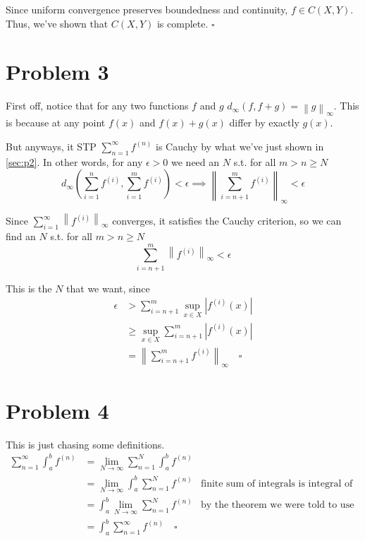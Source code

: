 \documentclass[12pt]{article}
\newcommand{\norm}[1]{\left\lVert#1\right\rVert}
\begin{document}
Since uniform convergence preserves boundedness and continuity, $f \in C(X, Y)$.
Thus, we've shown that $C(X, Y)$ is complete. $\square$

\pagebreak

\section{Problem 3}

First off, notice that for any two functions $f$ and $g$ $d_\infty(f, f+g) = \norm{g}_\infty$.
This is because at any point $f(x)$ and $f(x)+g(x)$ differ by exactly $g(x)$.

But anyways, it STP $\sum_{n=1}^\infty f^{(n)}$ is Cauchy by what we've just shown in \ref{sec:p2}.
In other words, for any $\epsilon > 0$ we need an $N$ s.t. for all $m > n \ge N$
\[d_\infty\left(\sum_{i=1}^n f^{(i)}, \sum_{i=1}^m f^{(i)}\right) < \epsilon
\implies \norm{\sum_{i=n+1}^m f^{(i)}}_\infty < \epsilon\]

Since $\sum_{i=1}^\infty \norm{f^{(i)}}_\infty$ converges,
it satisfies the Cauchy criterion, so we can find an $N$ s.t. for all $m > n \ge N$
\[\sum_{i=n+1}^m \norm{f^{(i)}}_\infty < \epsilon\]

This is the $N$ that we want, since
\begin{align*}
    \epsilon 
    &> \sum_{i=n+1}^m \sup_{x \in X} |f^{(i)}(x)| \\
    &\ge \sup_{x \in X} \sum_{i=n+1}^m |f^{(i)}(x)| \\
    &= \norm{\sum_{i=n+1}^m f^{(i)}}_\infty \quad\square
\end{align*}

\section{Problem 4}

This is just chasing some definitions.
\begin{align*}
    \sum_{n=1}^\infty \int_a^b f^{(n)}
    &= \lim_{N \to \infty} \sum_{n=1}^N \int_a^b f^{(n)} \\
    &= \lim_{N \to \infty} \int_a^b \sum_{n=1}^N f^{(n)} & \text{finite sum of integrals is integral of sums} \\
    &= \int_a^b \lim_{N \to \infty} \sum_{n=1}^N f^{(n)} & \text{by the theorem we were told to use} \\
    &= \int_a^b \sum_{n=1}^\infty f^{(n)}\quad\square
\end{align*}
\end{document}
